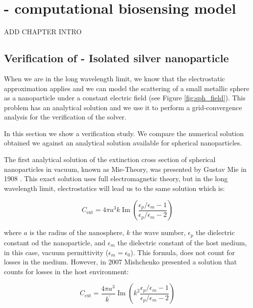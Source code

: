 \chapter{\pygbelspr - computational biosensing model} \label{chap:pygbe-lspr}
\graphicspath{{lspr_response_bsa/figs/}}


{\color{red}  ADD CHAPTER INTRO}

\section{Verification of \pygbe - Isolated silver nanoparticle } \label{sec:verification}

When we are in the long wavelength limit, we know that the electrostatic approximation 
applies and we can model the scattering of a small metallic sphere as a nanoparticle 
under a constant electric field (see Figure \ref{fig:sph_field}). This problem 
has an analytical solution and we use it to perform a grid-convergence analysis for 
the verification of the \pygbe solver.

In this section we show a verification study. We compare the numerical solution
obtained we \pygbe against an analytical solution available for spherical 
nanoparticles. 

The first analytical solution of the extinction cross section of spherical 
nanoparticles in vacuum, known as Mie-Theory, was presented by Gustav Mie in 1908
\cite{Mie1908}. This exact solution uses full electromagnetic theory, but in the 
long wavelength limit, electrostatics will lead us to the same solution 
\cite{BohrenHuffman1983} which is:

\begin{equation} \label{eq:Cext_analytical}
    C_\text{ext} = 4\pi a^3 k \operatorname{Im}\left(\frac{\epsilon_p/\epsilon_m -1}{\epsilon_p/\epsilon_m -2}\right)
\end{equation}

where $a$ is the radius of the nanosphere, $k$ the wave number, 
$\epsilon_p$ the dielectric constant od the nanoparticle, and $\epsilon_m$ the
dielectric constant of the host medium, in this case,  vacuum permittivity
($\epsilon_m = \epsilon_0$).  This formula, does not count for losses in the medium.
However, in 2007 Mishchenko presented a solution that counts for losses in
the host environment:

\begin{equation} \label{eq:Cext_analytical_lossy}
    C_\text{ext} = \frac{4\pi a^3}{k^\prime} \operatorname{Im}\left(k^2 \frac{\epsilon_p/\epsilon_m -1}{\epsilon_p/\epsilon_m -2}\right)
\end{equation}

